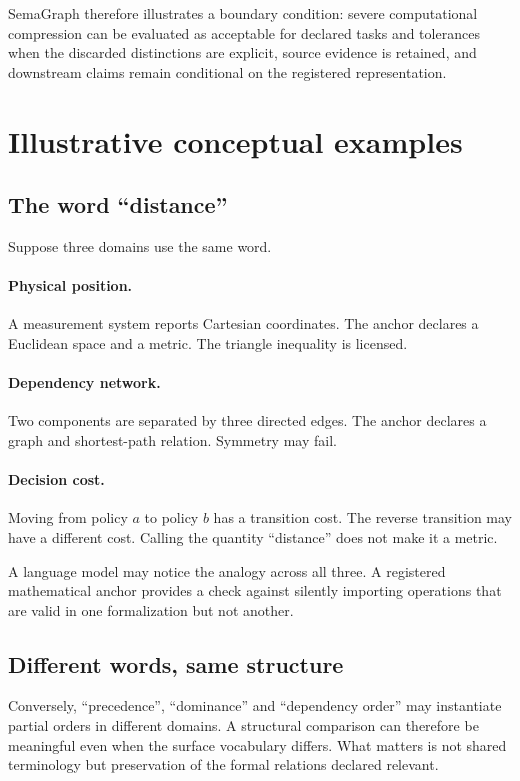 \documentclass[11pt,a4paper]{article}
\begin{document}
SemaGraph therefore illustrates a boundary condition: severe computational compression can be evaluated as acceptable for declared tasks and tolerances when the discarded distinctions are explicit, source evidence is retained, and downstream claims remain conditional on the registered representation.

\section{Illustrative conceptual examples}
\subsection{The word ``distance''}
Suppose three domains use the same word.

\paragraph{Physical position.} A measurement system reports Cartesian coordinates. The anchor declares a Euclidean space and a metric. The triangle inequality is licensed.

\paragraph{Dependency network.} Two components are separated by three directed edges. The anchor declares a graph and shortest-path relation. Symmetry may fail.

\paragraph{Decision cost.} Moving from policy $a$ to policy $b$ has a transition cost. The reverse transition may have a different cost. Calling the quantity ``distance'' does not make it a metric.

A language model may notice the analogy across all three. A registered mathematical anchor provides a check against silently importing operations that are valid in one formalization but not another.

\subsection{Different words, same structure}
Conversely, ``precedence'', ``dominance'' and ``dependency order'' may instantiate partial orders in different domains. A structural comparison can therefore be meaningful even when the surface vocabulary differs. What matters is not shared terminology but preservation of the formal relations declared relevant.
\end{document}
